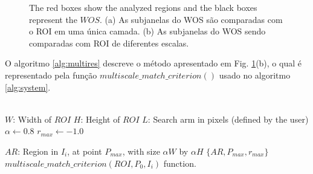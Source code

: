 \begin{figure}[H]
\centering
  \caption{The red boxes show the analyzed regions and the black boxes represent the $WOS$. 
  (a) As subjanelas do WOS são comparadas com o ROI em uma única camada. 
  (b) As subjanelas do WOS sendo comparadas com ROI de diferentes escalas.}
  \label{fig:multires}
\end{figure}

O algoritmo \ref{alg:multires} descreve o método apresentado em Fig. \ref{fig:multires}(b), o qual
é representado pela função $multiscale\_match\_criterion()$ usado no algoritmo \ref{alg:system}.


\begin{algorithm}
 ~\\
 $W$: Width of $ROI$\;
 $H$: Height of $ROI$\;
 $L$: Search arm in pixels (defined by the user)\;
 $\alpha \leftarrow 0.8$\;
 $r_{max} \leftarrow -1.0$\;
 ~\\
    
$AR$: Region in $I_i$, at point $P_{max}$, with size $\alpha W$ by $\alpha H$\;      
\Return $\{AR,P_{max},r_{max}\}$\;
~\\
\caption{$multiscale\_match\_criterion(ROI,P_0,I_i)$ function.}
\label{alg:multires}
\end{algorithm}

